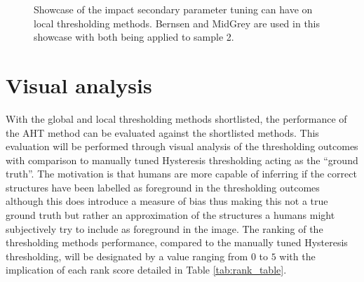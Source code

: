 \begin{figure}
	\caption[Showcase of the impact secondary parameter tuning can have on local thresholding methods.]{Showcase of the impact secondary parameter tuning can have on local thresholding methods. Bernsen and MidGrey are used in this showcase with both being applied to sample 2.}
	\label{fig:local_param_tuning}
\end{figure}

\clearpage
\section{Visual analysis}\label{sec:visual_analysis}
With the global and local thresholding methods shortlisted, the performance of the AHT method can be evaluated against the shortlisted methods. This evaluation will be performed through visual analysis of the thresholding outcomes with comparison to manually tuned Hysteresis thresholding acting as the ``ground truth''. The motivation is that humans are more capable of inferring if the correct structures have been labelled as foreground in the thresholding outcomes although this does introduce a measure of bias thus making this not a true ground truth but rather an approximation of the structures a humans might subjectively try to include as foreground in the image. The ranking of the thresholding methods performance, compared to the manually tuned Hysteresis thresholding, will be designated by a value ranging from $0$ to $5$ with the implication of each rank score detailed in Table \ref{tab:rank_table}.
